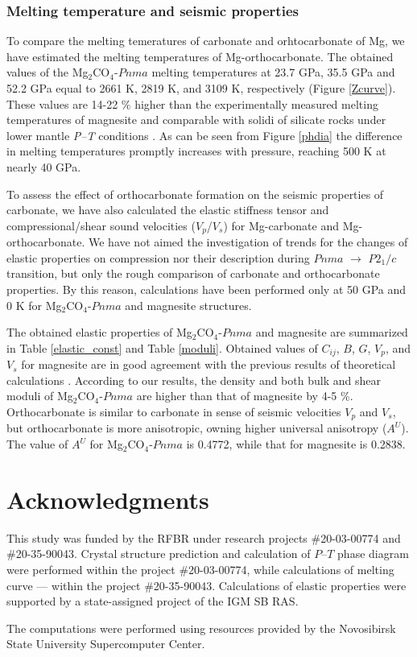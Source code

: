 \documentclass[a4paperm]{article}
\begin{document}
\subsubsection*{Melting temperature and seismic properties}
To compare the melting temeratures of carbonate and orhtocarbonate of Mg, we have estimated the melting temperatures of Mg-orthocarbonate.
The obtained values of the Mg$_2$CO$_4$-$Pnma$ melting temperatures at 23.7 GPa, 35.5 GPa and 52.2 GPa equal to 2661 K, 2819 K, and 3109 K, respectively (Figure \ref{Zcurve}).
These values are 14-22 \% higher than the experimentally measured melting temperatures of magnesite and comparable with solidi of silicate rocks under lower mantle {\it P--T} conditions \cite{litasov2018_review}.
As can be seen from Figure \ref{phdia} the difference in melting temperatures promptly increases with pressure, reaching 500 K at nearly 40 GPa.



To assess the effect of orthocarbonate formation on the seismic properties of carbonate, we have also calculated the elastic stiffness tensor and compressional/shear sound velocities ($V_p$/$V_s$) for Mg-carbonate and Mg-orthocarbonate.
We have not aimed the investigation of trends for the changes of elastic properties on compression nor their description during $Pnma$ $\to$ $P2_1/c$ transition, but only the rough comparison of carbonate and orthocarbonate properties.
By this reason, calculations have been performed only at 50 GPa and 0 K for Mg$_2$CO$_4$-$Pnma$ and magnesite structures.

The obtained elastic properties of Mg$_2$CO$_4$-$Pnma$ and magnesite are summarized in Table \ref{elastic_const} and Table \ref{moduli}.
Obtained values of $C_{ij}$, $B$, $G$, $V_p$, and $V_s$ for magnesite are in good agreement with the previous results of theoretical calculations \cite{li2020_mgco3}.
According to our results, the density and both bulk and shear moduli of Mg$_2$CO$_4$-$Pnma$ are higher than that of magnesite by 4-5 \%.
Orthocarbonate is similar to carbonate in sense of seismic velocities $V_p$ and $V_s$, but orthocarbonate is more anisotropic, owning higher universal anisotropy ($A^U$).
The value of $A^U$ for Mg$_2$CO$_4$-$Pnma$ is 0.4772, while that for magnesite is 0.2838.


\section*{Acknowledgments}
This study was funded by the RFBR under research projects \#20-03-00774 and \#20-35-90043.
Crystal structure prediction and calculation of $P$--$T$ phase diagram were performed within the project \#20-03-00774, while calculations of melting curve --- within the project \#20-35-90043.
Calculations of elastic properties were supported by a state-assigned project of the IGM SB RAS. 

The computations were performed using resources provided by the Novosibirsk State University Supercomputer Center.




\end{document}
